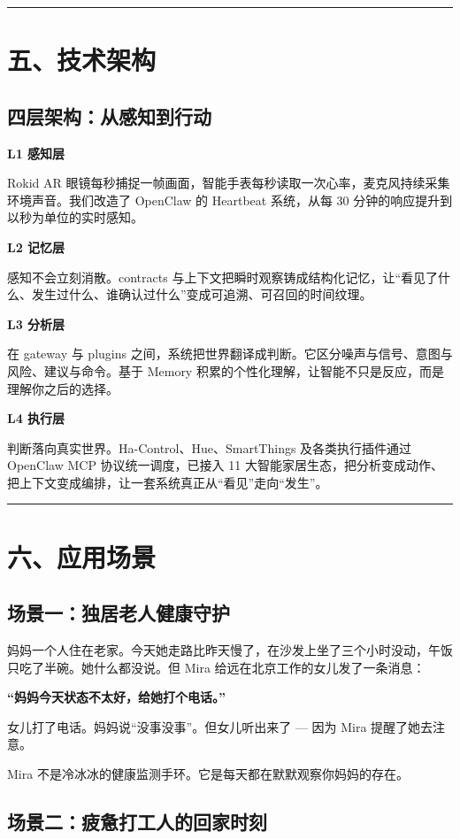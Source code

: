 \documentclass[11pt]{ctexart}
\newcommand{\SectionDivider}{%
  \vspace{0.9em}%
  {\color{MiraMuted}\rule{\linewidth}{0.6pt}}%
  \vspace{1.05em}%
}
\newcommand{\InlineLead}[2]{%
  \textbf{#1} #2\par
}
\begin{document}
\SectionDivider

\section*{五、技术架构}
\subsection*{四层架构：从感知到行动}

\InlineLead{L1 感知层}{}
Rokid AR 眼镜每秒捕捉一帧画面，智能手表每秒读取一次心率，麦克风持续采集环境声音。我们改造了 OpenClaw 的 Heartbeat 系统，从每 30 分钟的响应提升到以秒为单位的实时感知。

\InlineLead{L2 记忆层}{}
感知不会立刻消散。contracts 与上下文把瞬时观察铸成结构化记忆，让“看见了什么、发生过什么、谁确认过什么”变成可追溯、可召回的时间纹理。

\InlineLead{L3 分析层}{}
在 gateway 与 plugins 之间，系统把世界翻译成判断。它区分噪声与信号、意图与风险、建议与命令。基于 Memory 积累的个性化理解，让智能不只是反应，而是理解你之后的选择。

\InlineLead{L4 执行层}{}
判断落向真实世界。Ha-Control、Hue、SmartThings 及各类执行插件通过 OpenClaw MCP 协议统一调度，已接入 11 大智能家居生态，把分析变成动作、把上下文变成编排，让一套系统真正从“看见”走向“发生”。

\SectionDivider

\section*{六、应用场景}
\subsection*{场景一：独居老人健康守护}

妈妈一个人住在老家。今天她走路比昨天慢了，在沙发上坐了三个小时没动，午饭只吃了半碗。她什么都没说。但 Mira 给远在北京工作的女儿发了一条消息：

\begin{tcolorbox}[colback=MiraTableStripe,colframe=MiraWarmBorder]
\textbf{“妈妈今天状态不太好，给她打个电话。”}
\end{tcolorbox}

女儿打了电话。妈妈说“没事没事”。但女儿听出来了 --- 因为 Mira 提醒了她去注意。

Mira 不是冷冰冰的健康监测手环。它是每天都在默默观察你妈妈的存在。

\subsection*{场景二：疲惫打工人的回家时刻}
\end{document}
